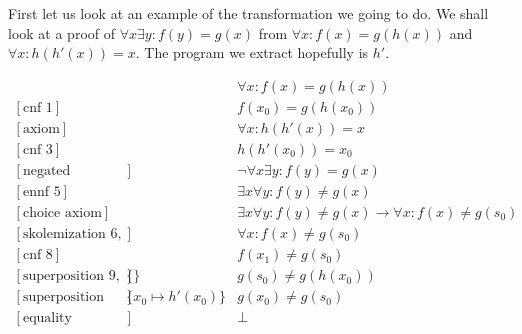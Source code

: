 \documentclass[onehalfspacing]{article}
\begin{document}
First let us look at an example of the transformation we going to do. We shall look at a proof of $\forall x\exists y: f(y) = g(x)$ from $\forall x: f(x) = g(h(x))$ and $\forall x: h(h'(x)) = x$. The program we extract hopefully is $h'$.

\begin{align}
	[\text{axiom}]&&\forall x: f(x) = g(h(x))\\
	[\text{cnf 1}]&&f(x_0) = g(h(x_0))\\
	[\text{axiom}]&&\forall x: h(h'(x)) = x\\
	[\text{cnf 3}]&&h(h'(x_0)) = x_0\\
	[\text{negated conjecture}]&&\neg\forall x\exists y: f(y) = g(x)\\
	[\text{ennf 5}]&&\exists x\forall y: f(y)\neq g(x)\\
	[\text{choice axiom}]&&\exists x\forall y: f(y)\neq g(x)\rightarrow \forall x : f(x) \neq g(s_0)\\
	[\text{skolemization 6, 7}]&&\forall x: f(x)\neq g(s_0)\\
	[\text{cnf 8}]&&f(x_1)\neq g(s_0)\\
	[\text{superposition 9, 2}]&\{\}&g(s_0)\neq g(h(x_0))\\
	[\text{superposition 10, 4}]&\{x_0\mapsto h'(x_0)\}&g(x_0)\neq g(s_0)\\
	[\text{equality resolution 11}]&&\bot
\end{align}
\end{document}
